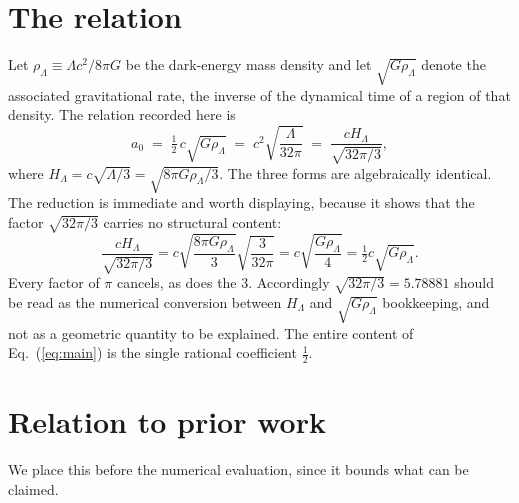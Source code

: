 \documentclass[aps,prd,reprint,amsmath,amssymb,nofootinbib,superscriptaddress]{revtex4-2}
\begin{document}
\section{The relation}

Let $\rho_\Lambda \equiv \Lambda c^2/8\pi G$ be the dark-energy mass density and let
$\sqrt{G\rho_\Lambda}$ denote the associated gravitational rate, the inverse of the dynamical time of a
region of that density. The relation recorded here is
\begin{equation}
a_0 \;=\; \tfrac{1}{2}\,c\sqrt{G\rho_\Lambda}
      \;=\; c^{2}\sqrt{\frac{\Lambda}{32\pi}}
      \;=\; \frac{cH_\Lambda}{\sqrt{32\pi/3}} ,
\label{eq:main}
\end{equation}
where $H_\Lambda = c\sqrt{\Lambda/3} = \sqrt{8\pi G\rho_\Lambda/3}$. The three forms are algebraically
identical. The reduction is immediate and worth displaying, because it shows that the factor
$\sqrt{32\pi/3}$ carries no structural content:
\begin{equation}
\frac{cH_\Lambda}{\sqrt{32\pi/3}}
= c\sqrt{\frac{8\pi G\rho_\Lambda}{3}}\sqrt{\frac{3}{32\pi}}
= c\sqrt{\frac{G\rho_\Lambda}{4}}
= \tfrac12 c\sqrt{G\rho_\Lambda}.
\label{eq:reduce}
\end{equation}
Every factor of $\pi$ cancels, as does the $3$. Accordingly $\sqrt{32\pi/3}=5.78881$ should be read as
the numerical conversion between $H_\Lambda$ and $\sqrt{G\rho_\Lambda}$ bookkeeping, and not as a
geometric quantity to be explained. The entire content of Eq.~(\ref{eq:main}) is the single rational
coefficient $\tfrac12$.

\section{Relation to prior work}

We place this before the numerical evaluation, since it bounds what can be claimed.
\end{document}
